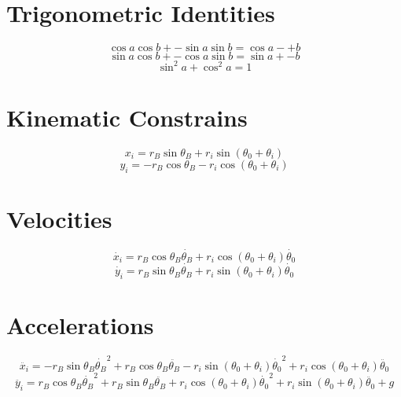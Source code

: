 \documentclass[titlepage]{article}
\numberwithin{equation}{section}
\begin{document}
\section{Trigonometric Identities}
\begin{equation} \label{eq:ti_coscos_sinsin}
\cos a \cos b +- \sin a \sin b = \cos{a -+ b}
\end{equation}
\begin{equation} \label{eq:ti_sincos_cossin}
\sin a \cos b +- \cos a \sin b = \sin{a +- b}
\end{equation}
\begin{equation} \label{eq:ti_sin2_cos2}
\sin^2 a + \cos^2 a = 1
\end{equation}

\section{Kinematic Constrains}
\begin{equation} \label{eq:x_i}
x_i = r_B \sin \theta_B + r_i \sin{(\theta_0 + \theta_i)}
\end{equation}
\begin{equation} \label{eq:y_i}
y_i = -r_B \cos \theta_B - r_i \cos{(\theta_0 + \theta_i)}
\end{equation}

\section{Velocities}
\begin{equation} \label{eq:x_i_dot}
\dot{x_i} = r_B \cos \theta_B \dot{\theta_B} + r_i \cos{(\theta_0 + \theta_i)} \dot{\theta_0}
\end{equation}
\begin{equation} \label{eq:y_i_dot}
\dot{y_i} = r_B \sin \theta_B \dot{\theta_B} + r_i \sin{(\theta_0 + \theta_i)} \dot{\theta_0}
\end{equation}

\section{Accelerations}
\begin{equation} \label{eq:x_i_ddot}
\ddot{x_i} =
    - r_B \sin \theta_B \dot{\theta_B}^2
    + r_B \cos \theta_B \ddot{\theta_B}
    - r_i \sin{(\theta_0 + \theta_i)} \dot{\theta_0}^2
    + r_i \cos{(\theta_0 + \theta_i)} \ddot{\theta_0}
\end{equation}
\begin{equation} \label{eq:y_i_ddot}
\ddot{y_i} = 
    r_B \cos \theta_B \dot{\theta_B}^2
    + r_B \sin \theta_B \ddot{\theta_B}
    + r_i \cos{(\theta_0 + \theta_i)} \dot{\theta_0}^2
    + r_i \sin{(\theta_0 + \theta_i)} \ddot{\theta_0}
    + g
\end{equation}
\end{document}
